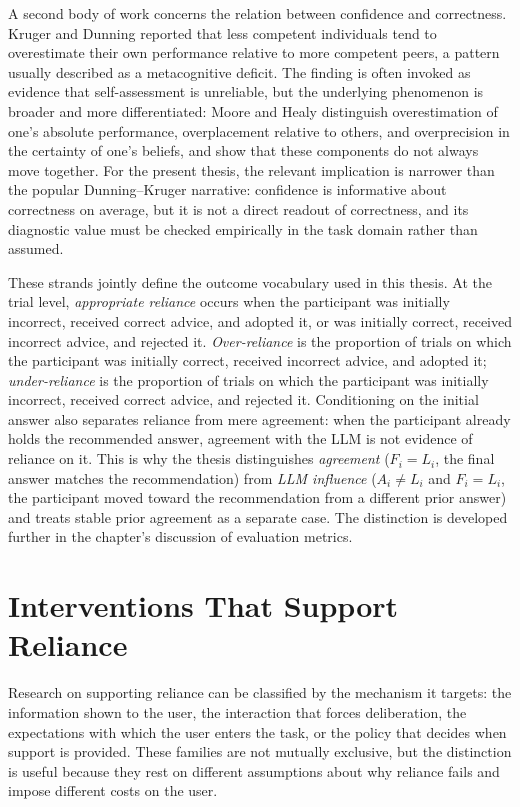 \documentclass[oneside,final,14pt,a4paper]{extreport}
\begin{document}
A second body of work concerns the relation between confidence and
correctness. Kruger and Dunning \cite{KrugerDunning1999} reported that less
competent individuals tend to overestimate their own performance relative to
more competent peers, a pattern usually described as a metacognitive deficit.
The finding is often invoked as evidence that self-assessment is unreliable,
but the underlying phenomenon is broader and more differentiated: Moore and
Healy \cite{MooreHealy2008} distinguish overestimation of one's absolute
performance, overplacement relative to others, and overprecision in the
certainty of one's beliefs, and show that these components do not always move
together. For the present thesis, the relevant implication is narrower than
the popular Dunning--Kruger narrative: confidence is informative about
correctness on average, but it is not a direct readout of correctness, and its
diagnostic value must be checked empirically in the task domain rather than
assumed.

These strands jointly define the outcome vocabulary used in this thesis. At
the trial level, \emph{appropriate reliance} occurs when the participant was
initially incorrect, received correct advice, and adopted it, or was initially
correct, received incorrect advice, and rejected it. \emph{Over-reliance} is
the proportion of trials on which the participant was initially correct,
received incorrect advice, and adopted it; \emph{under-reliance} is the
proportion of trials on which the participant was initially incorrect, received
correct advice, and rejected it. Conditioning on the initial answer also
separates reliance from mere agreement: when the participant already holds the
recommended answer, agreement with the LLM is not evidence of reliance on it.
This is why the thesis distinguishes \emph{agreement} ($F_i=L_i$, the final
answer matches the recommendation) from \emph{LLM influence} ($A_i\neq L_i$ and
$F_i=L_i$, the participant moved toward the recommendation from a different
prior answer) and treats stable prior agreement as a separate case. The
distinction is developed further in the chapter's discussion of evaluation
metrics.

\section{Interventions That Support Reliance}
\label{sec:lit-explanations}

Research on supporting reliance can be classified by the mechanism it targets:
the information shown to the user, the interaction that forces deliberation,
the expectations with which the user enters the task, or the policy that decides
when support is provided. These families are not mutually exclusive, but the
distinction is useful because they rest on different assumptions about why
reliance fails and impose different costs on the user.
\end{document}
